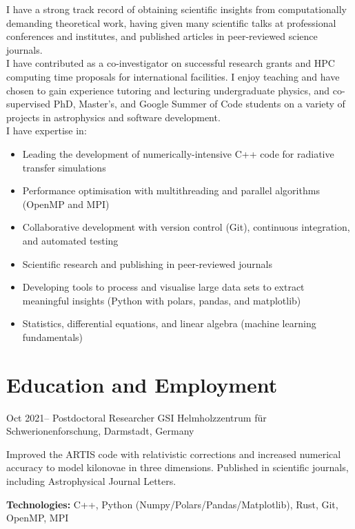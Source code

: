 \documentclass[11pt]{article} %
\begin{document}
I have a strong track record of obtaining scientific insights from computationally demanding theoretical work, having given many scientific talks at professional conferences and institutes, and published articles in peer-reviewed science journals.\\

I have contributed as a co-investigator on successful research grants and HPC computing time proposals for international facilities. I enjoy teaching and have chosen to gain experience tutoring and lecturing undergraduate physics, and co-supervised PhD, Master's, and Google Summer of Code students on a variety of projects in astrophysics and software development.\\
%


I have expertise in:
\begin{itemize}
  \item Leading the development of numerically-intensive C++ code for radiative transfer simulations
  \item Performance optimisation with multithreading and parallel algorithms (OpenMP and MPI)
  \item Collaborative development with version control (Git), continuous integration, and automated testing
  \item Scientific research and publishing in peer-reviewed journals
  \item Developing tools to process and visualise large data sets to extract meaningful insights (Python with polars, pandas, and matplotlib)
  \item Statistics, differential equations, and linear algebra (machine learning fundamentals)
\end{itemize}



\section{Education and Employment}

\job
{Oct 2021--}{}
{Postdoctoral Researcher}
{}
{GSI Helmholzzentrum für Schwerionenforschung, Darmstadt, Germany}
{\begin{itemize-noindent}
\item{Improved the ARTIS code with relativistic corrections and increased numerical accuracy to model kilonovae in three dimensions. Published in scientific journals, including Astrophysical Journal Letters.}
\end{itemize-noindent}
\textbf{Technologies:} C++, Python (Numpy/Polars/Pandas/Matplotlib), Rust, Git, OpenMP, MPI\\
}
\end{document}
